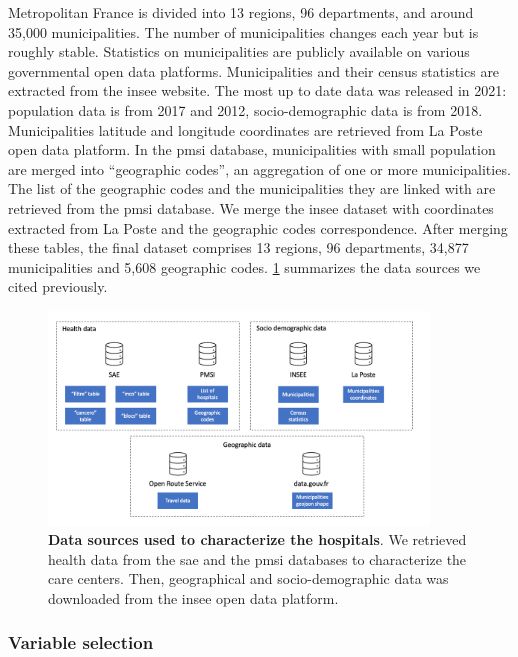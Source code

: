 Metropolitan France is divided into 13 regions, 96 departments, and
around 35,000 municipalities. The number of municipalities changes each year but
is roughly stable. Statistics on municipalities are publicly available on
various governmental open data platforms. Municipalities and their census
statistics are extracted from the \ac{insee} website. The most up to date data
was released in 2021: population data is from 2017 and 2012, socio-demographic
data is from 2018. Municipalities latitude and longitude coordinates are
retrieved from La Poste open data platform. In the \ac{pmsi} database,
municipalities with small population are merged into ``geographic codes'', an
aggregation of one or more municipalities. The list of the geographic codes and
the municipalities they are linked with are retrieved from the \ac{pmsi}
database. We merge the \ac{insee} dataset with coordinates
extracted from La Poste and the geographic codes correspondence. After merging
these tables, the final dataset comprises 13 regions, 96 departments, 34,877
municipalities and 5,608 geographic codes. \cref{fig:data-sources} summarizes
the data sources we cited previously.

\begin{figure}[h]
    \includegraphics[width=0.9\textwidth]{images/camion/databases.png}
    \centering
    \caption{ \textbf{Data sources used to characterize the hospitals}.
        We retrieved health data from the \acf{sae} and the \acf{pmsi} databases
        to characterize the care centers. Then,
        geographical and socio-demographic data was downloaded from the \acf{insee}
        open data platform. }
    \label{fig:data-sources}
\end{figure}

\subsubsection{Variable selection}

